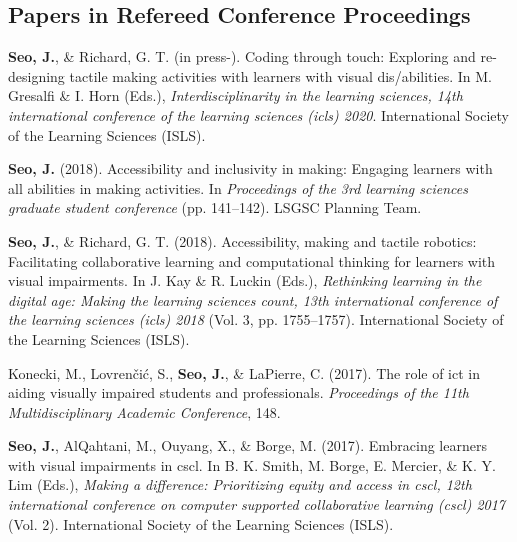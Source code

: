 \documentclass[11pt, a4paper]{awesome-cv}
\begin{document}
\endgroup

\hypertarget{papers-in-refereed-conference-proceedings}{%
\subsection{Papers in Refereed Conference Proceedings}\label{papers-in-refereed-conference-proceedings}}

\begingroup
\setlength{\parindent}{-0.5in}
\setlength{\leftskip}{0.5in}

\hypertarget{refs_proceedings}{}
\leavevmode\hypertarget{ref-seo2020coding}{}%
\textbf{Seo, J.}, \& Richard, G. T. (in press-). Coding through touch: Exploring and re-designing tactile making activities with learners with visual dis/abilities. In M. Gresalfi \& I. Horn (Eds.), \emph{Interdisciplinarity in the learning sciences, 14th international conference of the learning sciences (icls) 2020}. International Society of the Learning Sciences (ISLS).

\leavevmode\hypertarget{ref-seo2018making}{}%
\textbf{Seo, J.} (2018). Accessibility and inclusivity in making: Engaging learners with all abilities in making activities. In \emph{Proceedings of the 3rd learning sciences graduate student conference} (pp. 141--142). LSGSC Planning Team.

\leavevmode\hypertarget{ref-seo2018accessibility}{}%
\textbf{Seo, J.}, \& Richard, G. T. (2018). Accessibility, making and tactile robotics: Facilitating collaborative learning and computational thinking for learners with visual impairments. In J. Kay \& R. Luckin (Eds.), \emph{Rethinking learning in the digital age: Making the learning sciences count, 13th international conference of the learning sciences (icls) 2018} (Vol. 3, pp. 1755--1757). International Society of the Learning Sciences (ISLS).

\leavevmode\hypertarget{ref-konecki2017role}{}%
Konecki, M., Lovrenčić, S., \textbf{Seo, J.}, \& LaPierre, C. (2017). The role of ict in aiding visually impaired students and professionals. \emph{Proceedings of the 11th Multidisciplinary Academic Conference}, 148.

\leavevmode\hypertarget{ref-seo2017embracing}{}%
\textbf{Seo, J.}, AlQahtani, M., Ouyang, X., \& Borge, M. (2017). Embracing learners with visual impairments in cscl. In B. K. Smith, M. Borge, E. Mercier, \& K. Y. Lim (Eds.), \emph{Making a difference: Prioritizing equity and access in cscl, 12th international conference on computer supported collaborative learning (cscl) 2017} (Vol. 2). International Society of the Learning Sciences (ISLS).
\end{document}
